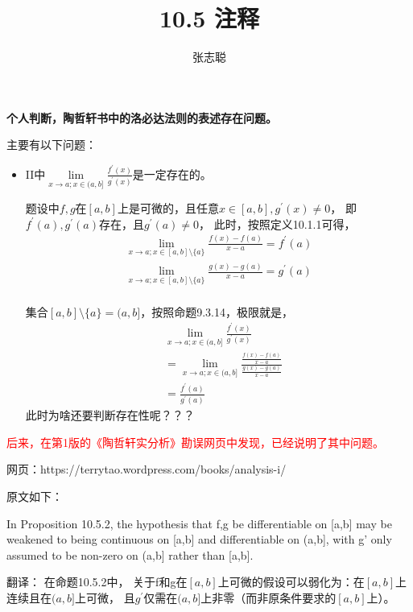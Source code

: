 \documentclass{article}
\begin{document}
\title{10.5 注释}
\author{张志聪}
\maketitle

\begin{zremark}
  \textbf{个人判断，陶哲轩书中的洛必达法则的表述存在问题。}
\end{zremark}

主要有以下问题：
\begin{itemize}
  \item II中$\lim\limits_{x \to a; x \in (a, b]} \frac{f^\prime(x)}{g^\prime(x)}$是一定存在的。

        题设中$f,g$在$[a, b]$上是可微的，且任意$x \in [a,b], g^\prime(x) \neq 0$，
        即$f^\prime(a),g^\prime(a)$存在，且$g^\prime(a) \neq 0$，
        此时，按照定义10.1.1可得，
        \begin{align*}
          \lim\limits_{x \to a; x \in [a, b] \setminus \{a\}} \frac{f(x) - f(a)}{x - a}
          = f^\prime(a) \\
          \lim\limits_{x \to a; x \in [a, b] \setminus \{a\}} \frac{g(x) - g(a)}{x - a}
          = g^\prime(a) \\
        \end{align*}

        集合$[a, b] \setminus \{a\} = (a, b]$，按照命题9.3.14，极限就是，
        \begin{align*}
           & \lim\limits_{x \to a; x \in (a, b]} \frac{f^\prime(x)}{g^\prime(x)}                               \\
           & = \lim\limits_{x \to a; x \in (a, b]} \frac{\frac{f(x) - f(a)}{x - a}}{\frac{g(x) - g(a)}{x - a}} \\
           & = \frac{f^\prime(a)}{g^\prime(a)}
        \end{align*}
        此时为啥还要判断存在性呢？？？
\end{itemize}


\textcolor{red}{后来，在第1版的《陶哲轩实分析》勘误网页中发现，已经说明了其中问题。}

网页：https://terrytao.wordpress.com/books/analysis-i/

原文如下：
\begin{zremark}
  In Proposition 10.5.2,
  the hypothesis that f,g be differentiable on [a,b] may be weakened
  to being continuous on [a,b] and differentiable on (a,b],
  with g' only assumed to be non-zero on (a,b] rather than [a,b].

  翻译：
  在命题10.5.2中，
  关于f和g在$[a,b]$上可微的假设可以弱化为：在$[a,b]$上连续且在$(a,b]$上可微，
  且$g^\prime$仅需在$(a,b]$上非零（而非原条件要求的$[a,b]$上）。
\end{zremark}
\end{document}

